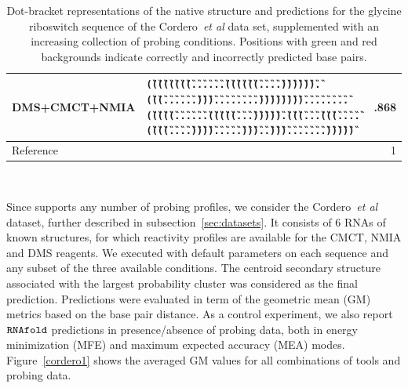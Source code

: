 \documentclass[a4,center,fleqn]{NAR}
\newcommand{\Software}[1]{\text{\ttfamily\bfseries #1}}
\newcommand{\OurTool}{\Software{IPANEMAP}\xspace}
\newcommand{\etal}{~\emph{et al} }
\begin{document}
\begin{table}
\begin{adjustbox}{max width=\linewidth}
\begin{tabular}{@{}llr@{}}
			DMS+CMCT+NMIA & {\tt \G{(}\G{(}\G{(}\G{(}\G{(}\G{(}\G{(}\G{(}\G{.}\G{.}\G{.}\G{.}\G{.}\G{.}\G{(}\G{(}\G{(}\G{(}\G{(}\G{(}\G{.}\G{.}\G{.}\G{.}\G{)}\G{)}\G{)}\G{)}\G{)}\G{)}\G{.}\G{(}\G{(}\G{(}\B{(}\B{(}\B{(}\B{(}\B{(}\B{.}\B{.}\G{.}\G{.}\G{.}\G{.}\B{)}\B{)}\B{)}\B{)}\B{)}\G{.}\G{.}\G{)}\G{)}\G{)}\G{.}\G{.}\G{.}\G{.}\G{.}\G{.}\G{.}\G{.}\G{)}\G{)}\G{)}\G{)}\G{)}\G{)}\G{)}\G{)}\G{.}\G{.}\G{.}\G{.}\G{.}\G{.}\G{.}\G{.}\G{(}\G{(}\G{(}\G{(}\G{(}\G{.}\G{.}\G{.}\G{.}\G{.}\G{.}\G{(}\G{(}\G{(}\G{(}\G{(}\B{(}\G{.}\G{.}\G{.}\B{)}\G{)}\G{)}\G{)}\G{)}\G{)}\G{.}\G{(}\G{(}\G{(}\G{.}\G{.}\G{.}\B{(}\G{(}\G{(}\G{(}\G{.}\G{.}\G{.}\G{.}\G{(}\G{(}\G{(}\G{(}\G{.}\G{.}\G{.}\G{.}\G{)}\G{)}\G{)}\G{)}\G{.}\G{.}\G{.}\G{.}\G{.}\G{)}\G{)}\G{)}\B{)}\G{.}\G{.}\G{)}\G{)}\G{)}\G{.}\G{.}\G{.}\G{.}\G{.}\G{.}\G{.}\G{)}\G{)}\G{)}\G{)}\G{)}} & \textbf{.868}\\ \midrule
			Reference& {\tt \Base{((((((((......((((((....)))))).(((....(((.....)))...)))........))))))))........(((((......(((((.....))))).(((....(((....((((....)))).....)))...))).......)))))}}& 1\\
			\bottomrule
		\end{tabular}
	\end{adjustbox}\\
	\caption{Dot-bracket representations of the native structure and \OurTool{} predictions for the glycine riboswitch sequence of the Cordero\etal\cite{Cordero2012} data set, supplemented with an increasing collection of probing conditions. Positions with green and red backgrounds indicate correctly and incorrectly predicted base pairs.}\label{fig:glycine_example}
\end{table}


Since \OurTool{} supports any number of probing profiles, we consider the Cordero~\emph{et al} dataset, further described in subsection~\ref{sec:datasets}. It consists of 6 RNAs of known structures, for which reactivity profiles are available for the CMCT, NMIA and DMS reagents. We executed \OurTool{} with default parameters on each sequence and any subset of the three available conditions. The centroid secondary structure  associated with the largest probability cluster was considered as the final prediction. Predictions were evaluated in term of the geometric mean (GM) metrics based on the base pair distance. As a control experiment, we also report ${\tt RNAfold}$ predictions in presence/absence of probing data, both in energy minimization (MFE) and maximum expected accuracy (MEA) modes. Figure~\ref{cordero1} shows the averaged GM values for all combinations of tools and probing data.
\end{document}
